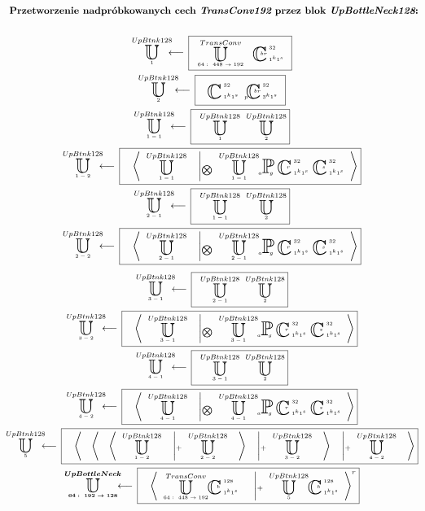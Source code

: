 \begin{equation*}
\begin{gathered}
\textbf{Przetworzenie nadpróbkowanych cech $\textit{TransConv192}$ przez blok $\textit{UpBottleNeck128}$:}
\\~\\
\xunitdef{UpBtnk128}{1}{\quad
\xunit{TransConv}{64:\ 448\rightarrow192}{} \quad
\xconv{\ 1^k1^s}{\ 32}{}{}{br}}
\\
\xunitdef{UpBtnk128}{2}{\quad
\xconv{\ 1^k1^s}{\ 32}{}{}{}
\xconv{\ 3^k1^s}{\ 32}{p}{}{br}}
\\
\xunitdef{UpBtnk128}{1-1}{\quad
\xunit{UpBtnk128}{1}{} \quad
\xunit{UpBtnk128}{2}{}}
\\
\xunitdef{UpBtnk128}{1-2}{\quad
\xaggreg{\quad
\xunit{UpBtnk128}{1-1}{}
\quad \left|_{\bigotimes} \quad
\xunit{UpBtnk128}{1-1}{}
\xpool{g}{}{a}{}{}
\xconv{\ 1^k1^s}{\ 32}{}{}{r}
\xconv{\ 1^k1^s}{\ 32}{}{}{s}
\right.}}
\\
\xunitdef{UpBtnk128}{2-1}{\quad
\xunit{UpBtnk128}{1-1}{} \quad
\xunit{UpBtnk128}{2}{}}
\\
\xunitdef{UpBtnk128}{2-2}{\quad
\xaggreg{\quad
\xunit{UpBtnk128}{2-1}{}
\quad \left|_{\bigotimes} \quad
\xunit{UpBtnk128}{2-1}{}
\xpool{g}{}{a}{}{}
\xconv{\ 1^k1^s}{\ 32}{}{}{r}
\xconv{\ 1^k1^s}{\ 32}{}{}{s}
\right.}}
\end{gathered}
\end{equation*}
\begin{equation*}
\begin{gathered}
\xunitdef{UpBtnk128}{3-1}{\quad
\xunit{UpBtnk128}{2-1}{} \quad
\xunit{UpBtnk128}{2}{}}
\\
\xunitdef{UpBtnk128}{3-2}{\quad
\xaggreg{\quad
\xunit{UpBtnk128}{3-1}{}
\quad \left|_{\bigotimes} \quad
\xunit{UpBtnk128}{3-1}{}
\xpool{g}{}{a}{}{}
\xconv{\ 1^k1^s}{\ 32}{}{}{r}
\xconv{\ 1^k1^s}{\ 32}{}{}{s}
\right.}}
\\
\xunitdef{UpBtnk128}{4-1}{\quad
\xunit{UpBtnk128}{3-1}{} \quad
\xunit{UpBtnk128}{2}{}}
\\
\xunitdef{UpBtnk128}{4-2}{\quad
\xaggreg{\quad
\xunit{UpBtnk128}{4-1}{}
\quad \left|_{\bigotimes} \quad
\xunit{UpBtnk128}{4-1}{}
\xpool{g}{}{a}{}{}
\xconv{\ 1^k1^s}{\ 32}{}{}{r}
\xconv{\ 1^k1^s}{\ 32}{}{}{s}
\right.}}
\\
\xunitdef{UpBtnk128}{5}{\quad
\xaggreg{\quad
\xaggreg{\quad
\xaggreg{\quad
\xunit{UpBtnk128}{1-2}{}
\quad \left|_+ \quad
\xunit{UpBtnk128}{2-2}{}
\right.\quad}
\quad \left|_+ \quad
\xunit{UpBtnk128}{3-2}{}
\right.\quad}
\quad \left|_+ \quad
\xunit{UpBtnk128}{4-2}{}
\right.\quad}}
\\
\xunitdef{\boldsymbol{UpBottleNeck}}{\boldsymbol{64:\ 192\rightarrow128}}{\quad
\xaggreg{\quad
\xunit{TransConv}{64:\ 448\rightarrow192}{}
\xconv{\ 1^k1^s}{\ 128}{}{}{b}
\quad \left|_+ \quad
\xunit{UpBtnk128}{5}{}
\xconv{\ 1^k1^s}{\ 128}{}{}{b}
\right.}^r}
\end{gathered}
\end{equation*}
